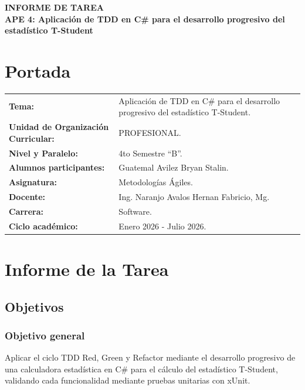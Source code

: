 \documentclass[12pt]{article}
\begin{document}
\begin{center}
{\large \textbf{INFORME DE TAREA}} \\[0.3cm]
{\large \textbf{APE 4: Aplicación de TDD en C\# para el desarrollo progresivo del estadístico T-Student}}
\end{center}

\section{Portada}

\begin{flushleft}
\begin{tabular}{>{\bfseries}p{6cm} p{8cm}}
Tema: & Aplicación de TDD en C\# para el desarrollo progresivo del estadístico T-Student. \\
Unidad de Organización Curricular: & PROFESIONAL. \\
Nivel y Paralelo: & 4to Semestre ``B''. \\
Alumnos participantes: & Guatemal Avilez Bryan Stalin. \\
Asignatura: & Metodologías Ágiles. \\
Docente: & Ing. Naranjo Avalos Hernan Fabricio, Mg. \\
Carrera: & Software. \\
Ciclo académico: & Enero 2026 - Julio 2026. \\
\end{tabular}
\end{flushleft}

\section{Informe de la Tarea}

\subsection{Objetivos}

\subsubsection{Objetivo general}

Aplicar el ciclo TDD Red, Green y Refactor mediante el desarrollo progresivo de una calculadora estadística en C\# para el cálculo del estadístico T-Student, validando cada funcionalidad mediante pruebas unitarias con xUnit.
\end{document}
